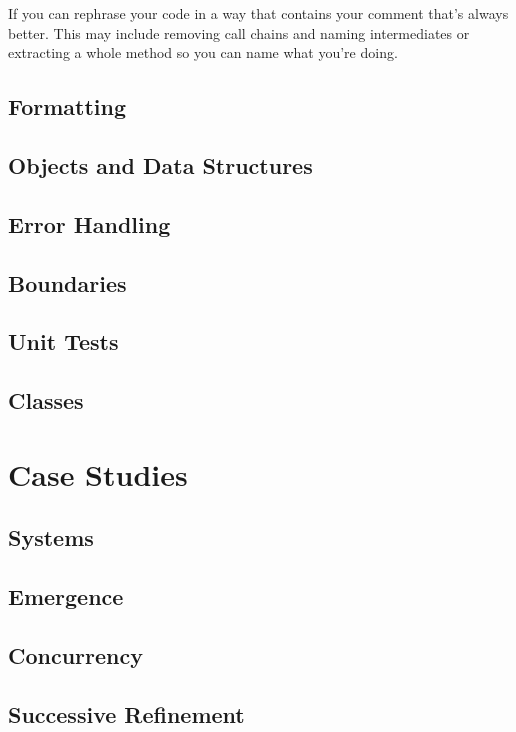 \documentclass[a4paper, twocolumn]{article}
\begin{document}
If you can rephrase your code in a way that contains your comment that's always better. This may include removing call chains and naming intermediates or extracting a whole method so you can name what you're doing.

\subsection{Formatting}

\subsection{Objects and Data Structures}

\subsection{Error Handling}

\subsection{Boundaries}

\subsection{Unit Tests}

\subsection{Classes}


\section{Case Studies}

\subsection{Systems}

\subsection{Emergence}

\subsection{Concurrency}

\subsection{Successive Refinement}
\end{document}
